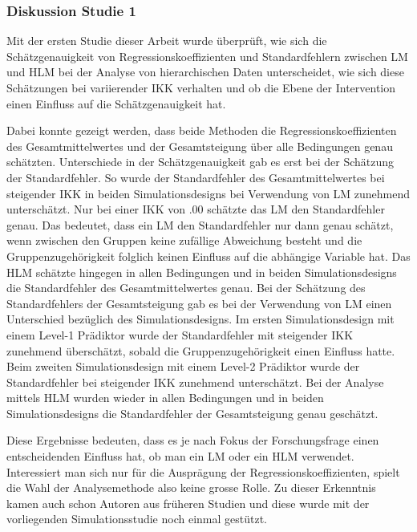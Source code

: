\documentclass[12pt]{article}\usepackage[]{graphicx}\usepackage[]{color}
\begin{document}
\subsubsection{Diskussion Studie 1}
Mit der ersten Studie dieser Arbeit wurde überprüft, wie sich die Schätzgenauigkeit von Regressionskoeffizienten und Standardfehlern zwischen LM und HLM bei der Analyse von hierarchischen Daten unterscheidet, wie sich diese Schätzungen bei variierender IKK verhalten und ob die Ebene der Intervention einen Einfluss auf die Schätzgenauigkeit hat. 

Dabei konnte gezeigt werden, dass beide Methoden die Regressionskoeffizienten des Gesamtmittelwertes und der Gesamtsteigung über alle Bedingungen genau schätzten. Unterschiede in der Schätzgenauigkeit gab es erst bei der Schätzung der Standardfehler. So wurde der Standardfehler des Gesamtmittelwertes bei steigender IKK in beiden Simulationsdesigns bei Verwendung von LM zunehmend unterschätzt. Nur bei einer IKK von .00 schätzte das LM den Standardfehler genau. Das bedeutet, dass ein LM den Standardfehler nur dann genau schätzt, wenn zwischen den Gruppen keine zufällige Abweichung besteht und die Gruppenzugehörigkeit folglich keinen Einfluss auf die abhängige Variable hat. Das HLM schätzte hingegen in allen Bedingungen und in beiden Simulationsdesigns die Standardfehler des Gesamtmittelwertes genau. Bei der Schätzung des Standardfehlers der Gesamtsteigung gab es bei der Verwendung von LM einen Unterschied bezüglich des Simulationsdesigns. Im ersten Simulationsdesign mit einem Level-1 Prädiktor wurde der Standardfehler mit steigender IKK zunehmend überschätzt, sobald die Gruppenzugehörigkeit einen Einfluss hatte. Beim zweiten Simulationsdesign mit einem Level-2 Prädiktor wurde der Standardfehler bei steigender IKK zunehmend unterschätzt. Bei der Analyse mittels HLM wurden wieder in allen Bedingungen und in beiden Simulationsdesigns die Standardfehler der Gesamtsteigung genau geschätzt.

Diese Ergebnisse bedeuten, dass es je nach Fokus der Forschungsfrage einen entscheidenden Einfluss hat, ob man ein LM oder ein HLM verwendet. Interessiert man sich nur für die Ausprägung der Regressionskoeffizienten, spielt die Wahl der Analysemethode also keine grosse Rolle. Zu dieser Erkenntnis kamen auch schon Autoren aus früheren Studien \citep{mcneish2014analyzing, mundfrom2002monte, osborne2000advantages} und diese wurde mit der vorliegenden Simulationsstudie noch einmal gestützt. 
\end{document}
